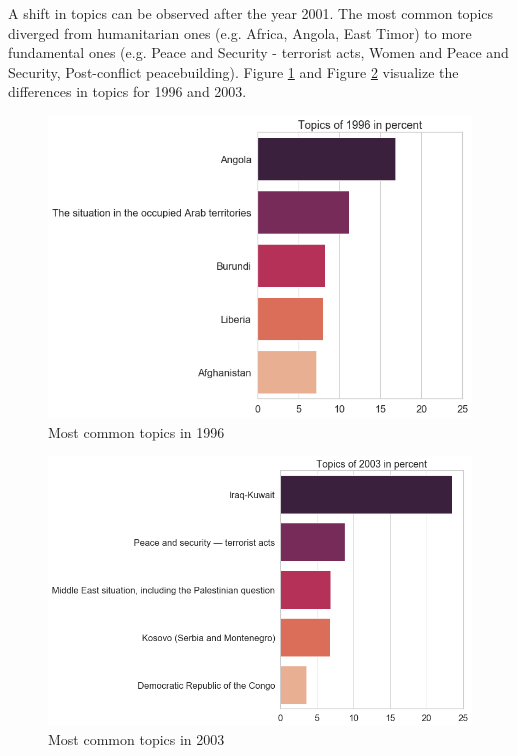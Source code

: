 A shift in topics can be observed after the year 2001. The most common topics diverged from humanitarian ones (e.g. Africa, Angola, East Timor) to more fundamental ones (e.g. Peace and Security - terrorist acts, Women and Peace and Security, Post-conflict peacebuilding). Figure \ref{common_2} and Figure \ref{common_3} visualize the differences in topics for 1996 and 2003. 



\begin{figure}[t]
  \centering
  \includegraphics[width=12cm]{img/1996_most_common_topics.png}
  \caption{Most common topics in 1996}
  \label{common_2}
  
\end{figure}%
\begin{figure}[t]
  \centering
  \includegraphics[width=12cm]{img/2003_most_common_topics.png}
  \caption{Most common topics in 2003}
  \label{common_3}
\end{figure}%

